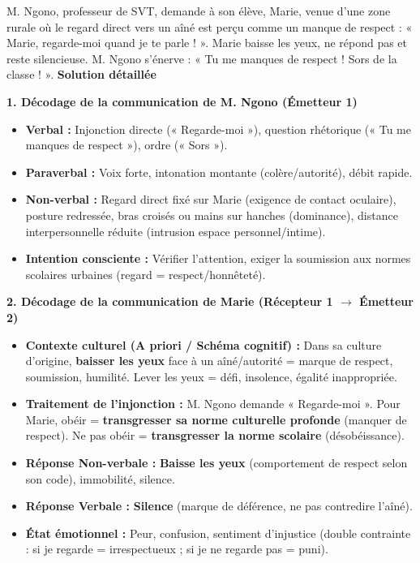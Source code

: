\documentclass[11pt]{article}
\newcommand{\cle}[1]{{\popxbold\color{popdark}#1}}
\begin{document}
\begin{exoresolu}
M. Ngono, professeur de SVT, demande à son élève, Marie, venue d'une zone rurale où le regard direct vers un aîné est perçu comme un manque de respect : « Marie, regarde-moi quand je te parle ! ». Marie baisse les yeux, ne répond pas et reste silencieuse. M. Ngono s'énerve : « Tu me manques de respect ! Sors de la classe ! ».
\tcblower
\textbf{Solution détaillée}

\textbf{1. Décodage de la communication de M. Ngono (Émetteur 1)}
\begin{itemize}
    \item \textbf{Verbal :} Injonction directe (« Regarde-moi »), question rhétorique (« Tu me manques de respect »), ordre (« Sors »).
    \item \textbf{Paraverbal :} Voix forte, intonation montante (colère/autorité), débit rapide.
    \item \textbf{Non-verbal :} Regard direct fixé sur Marie (exigence de contact oculaire), posture redressée, bras croisés ou mains sur hanches (dominance), distance interpersonnelle réduite (intrusion espace personnel/intime).
    \item \textbf{Intention consciente :} Vérifier l'attention, exiger la soumission aux normes scolaires urbaines (regard = respect/honnêteté).
\end{itemize}

\textbf{2. Décodage de la communication de Marie (Récepteur 1 $\to$ Émetteur 2)}
\begin{itemize}
    \item \textbf{Contexte culturel (A priori / Schéma cognitif) :} Dans sa culture d'origine, \textbf{baisser les yeux} face à un aîné/autorité = \cle{marque de respect}, soumission, humilité. Lever les yeux = défi, insolence, égalité inappropriée.
    \item \textbf{Traitement de l'injonction :} M. Ngono demande « Regarde-moi ». Pour Marie, obéir = \textbf{transgresser sa norme culturelle profonde} (manquer de respect). Ne pas obéir = \textbf{transgresser la norme scolaire} (désobéissance).
    \item \textbf{Réponse Non-verbale :} \textbf{Baisse les yeux} (comportement de respect selon son code), immobilité, silence.
    \item \textbf{Réponse Verbale :} \textbf{Silence} (marque de déférence, ne pas contredire l'aîné).
    \item \textbf{État émotionnel :} Peur, confusion, sentiment d'injustice (double contrainte : si je regarde = irrespectueux ; si je ne regarde pas = puni).
\end{itemize}


\end{exoresolu}
\end{document}
